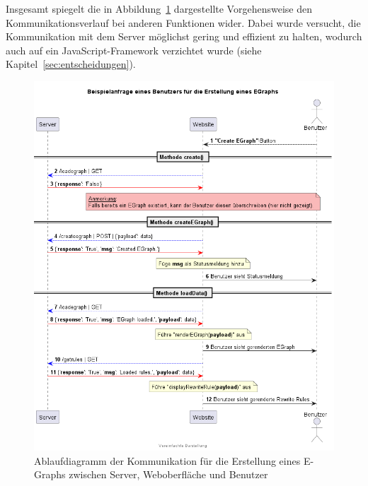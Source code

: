 
Insgesamt spiegelt die in Abbildung~\ref{fig:ablauf} dargestellte Vorgehensweise den Kommunikationsverlauf bei anderen Funktionen wider.
Dabei wurde versucht, die Kommunikation mit dem Server möglichst gering und effizient zu halten, wodurch auch auf ein JavaScript-Framework verzichtet wurde (siehe Kapitel~\ref{sec:entscheidungen}).

\begin{figure}[H]
  \centering
  \includegraphics[scale=0.6]{../fig/query.png}
  \caption{Ablaufdiagramm der Kommunikation für die Erstellung eines E-Graphs zwischen Server, Weboberfläche und Benutzer}
  \label{fig:ablauf}
\end{figure}
